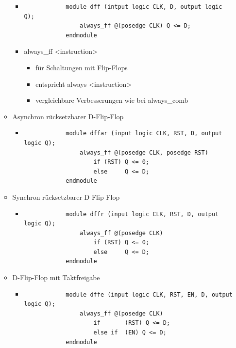 \documentclass[11pt,a4paper]{article}
\begin{document}
\begin{itemize}
\begin{itemize}
\begin{itemize}
		\item[] 
			\begin{lstlisting}
			module dff (intput logic CLK, D, output logic Q);
				always_ff @(posedge CLK) Q <= D;
			endmodule
			\end{lstlisting}	
		
		\item always\_ff <instruction>
			\begin{itemize}
			\item für Schaltungen mit Flip-Flops
			\item entspricht always <instruction>
			\item vergleichbare Verbesserungen wie bei always\_comb
			\end{itemize}				
		
		\end{itemize}		
		
	\item Asynchron rücksetzbarer D-Flip-Flop
		\begin{itemize}
		\item[]
			\begin{lstlisting}
			module dffar (input logic CLK, RST, D, output logic Q);
				always_ff @(posedge CLK, posedge RST)
					if (RST) Q <= 0;
					else 	 Q <= D;
			endmodule
			\end{lstlisting}
		\end{itemize}		
		
	\item Synchron rücksetzbarer D-Flip-Flop
		\begin{itemize}
		\item[]
			\begin{lstlisting}
			module dffr (input logic CLK, RST, D, output logic Q);
				always_ff @(posedge CLK)
					if (RST) Q <= 0;
					else 	 Q <= D;
			endmodule
			\end{lstlisting}
		\end{itemize}			
	
	\item D-Flip-Flop mit Taktfreigabe
		\begin{itemize}
		\item[]
			\begin{lstlisting}
			module dffe (input logic CLK, RST, EN, D, output logic Q);
				always_ff @(posedge CLK)
					if		 (RST) Q <= D;
					else if  (EN) Q <= D;
			endmodule
			\end{lstlisting}
		\end{itemize}			
	

\end{itemize}
\end{itemize}
\end{document}
